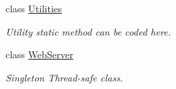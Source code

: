 \begin{DoxyCompactItemize}
class \mbox{\hyperlink{class_concord_1_1_c3_http_module_1_1_utilities}{Utilities}}
\begin{DoxyCompactList}\small\item\em Utility static method can be coded here. \end{DoxyCompactList}\item 
class \mbox{\hyperlink{class_concord_1_1_c3_http_module_1_1_web_server}{Web\+Server}}
\begin{DoxyCompactList}\small\item\em Singleton Thread-\/safe class. \end{DoxyCompactList}\end{DoxyCompactItemize}
